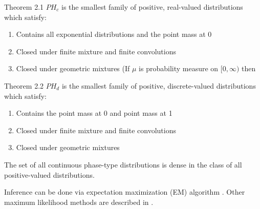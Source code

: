 \begin{theorem}\cite{maier1992} Theorem 2.1
$PH_c$ is the smallest family of positive, real-valued distributions which satisfy:
\begin{enumerate}
    \item Contains all exponential distributions and the point mass at 0
    \item Closed under finite mixture and finite convolutions
    \item Closed under geometric mixtures (If $\mu$ is probability measure on $[0, \infty)$ then 
    
\end{enumerate}
\end{theorem}

\begin{theorem}\cite{maier1992} Theorem 2.2
$PH_d$ is the smallest family of positive, discrete-valued distributions which satisfy:
\begin{enumerate}
    \item Contains the point mass at 0 and point mass at 1
    \item Closed under finite mixture and finite convolutions
    \item Closed under geometric mixtures
\end{enumerate}
\end{theorem}

\begin{theorem} \cite{neuts1981}
The set of all continuous phase-type distributions is dense in the class of all positive-valued distributions.
\end{theorem}

Inference can be done via expectation maximization (EM) algorithm \cite{Asmussen1996}.
Other maximum likelihood methods are described in \cite{mle_phase_type2011}.

